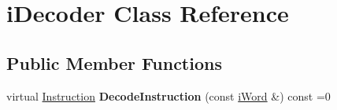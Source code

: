 \hypertarget{classiDecoder}{
\section{iDecoder Class Reference}
\label{classiDecoder}
}
\subsection*{Public Member Functions}
\begin{DoxyCompactItemize}
\item 
\hypertarget{classiDecoder_a7b1dc8de3935d9e3a9f7397028662eb3}{
virtual \hyperlink{structInstruction}{Instruction} {\bfseries DecodeInstruction} (const \hyperlink{classiWord}{iWord} \&) const =0}
\label{classiDecoder_a7b1dc8de3935d9e3a9f7397028662eb3}

\end{DoxyCompactItemize}

